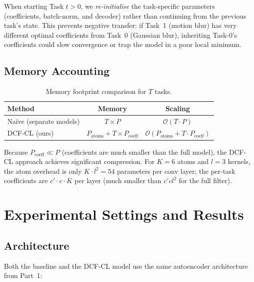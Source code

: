 \documentclass[11pt,letterpaper]{article}
\begin{document}
When starting Task $t > 0$, we \emph{re-initialise} the task-specific
parameters (coefficients, batch-norm, and decoder) rather than continuing
from the previous task's state.  This prevents negative transfer: if
Task~1 (motion blur) has very different optimal coefficients from Task~0
(Gaussian blur), inheriting Task-0's coefficients could slow convergence or
trap the model in a poor local minimum.

\subsection{Memory Accounting}

\begin{table}[h]
\centering
\caption{Memory footprint comparison for $T$ tasks.}
\label{tab:memory}
\begin{tabular}{lcc}
\toprule
Method & Memory & Scaling \\
\midrule
Na\"ive (separate models) & $T \times P$ & $\mathcal{O}(T \cdot P)$ \\
DCF-CL (ours) & $P_{\text{atoms}} + T \times P_{\text{coeff}}$ & $\mathcal{O}(P_{\text{atoms}} + T \cdot P_{\text{coeff}})$ \\
\bottomrule
\end{tabular}
\end{table}

Because $P_{\text{coeff}} \ll P$ (coefficients are much smaller than the
full model), the DCF-CL approach achieves significant compression.  For $K=6$
atoms and $l{=}3$ kernels, the atom overhead is only $K \cdot l^2 = 54$
parameters per conv layer; the per-task coefficients are
$c' \cdot c \cdot K$ per layer (much smaller than $c' c l^2$ for the full
filter).

\section{Experimental Settings and Results}
\label{sec:experiments}

\subsection{Architecture}

Both the baseline and the DCF-CL model use the same autoencoder architecture
from Part~1:
\end{document}
